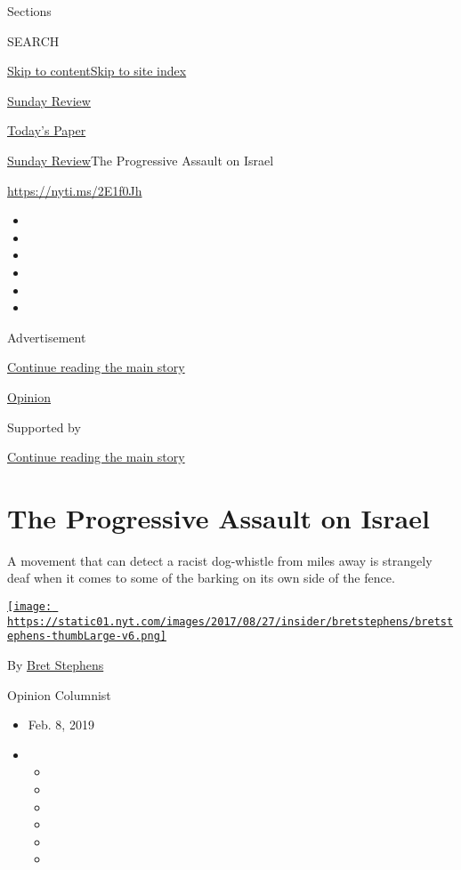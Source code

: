 Sections

SEARCH

\protect\hyperlink{site-content}{Skip to
content}\protect\hyperlink{site-index}{Skip to site index}

\href{https://www.nytimes.com/section/opinion/sunday}{Sunday Review}

\href{https://myaccount.nytimes.com/auth/login?response_type=cookie\&client_id=vi}{}

\href{https://www.nytimes.com/section/todayspaper}{Today's Paper}

\href{/section/opinion/sunday}{Sunday Review}\textbar{}The Progressive
Assault on Israel

\url{https://nyti.ms/2E1f0Jh}

\begin{itemize}
\item
\item
\item
\item
\item
\item
\end{itemize}

Advertisement

\protect\hyperlink{after-top}{Continue reading the main story}

\href{/section/opinion}{Opinion}

Supported by

\protect\hyperlink{after-sponsor}{Continue reading the main story}

\hypertarget{the-progressive-assault-on-israel}{%
\section{The Progressive Assault on
Israel}\label{the-progressive-assault-on-israel}}

A movement that can detect a racist dog-whistle from miles away is
strangely deaf when it comes to some of the barking on its own side of
the fence.

\href{https://www.nytimes.com/by/bret-stephens}{\texttt{[image: https://static01.nyt.com/images/2017/08/27/insider/bretstephens/bretstephens-thumbLarge-v6.png]}}

By \href{https://www.nytimes.com/by/bret-stephens}{Bret Stephens}

Opinion Columnist

\begin{itemize}
\item
  Feb. 8, 2019
\item
  \begin{itemize}
  \item
  \item
  \item
  \item
  \item
  \item
  \end{itemize}
\end{itemize}

